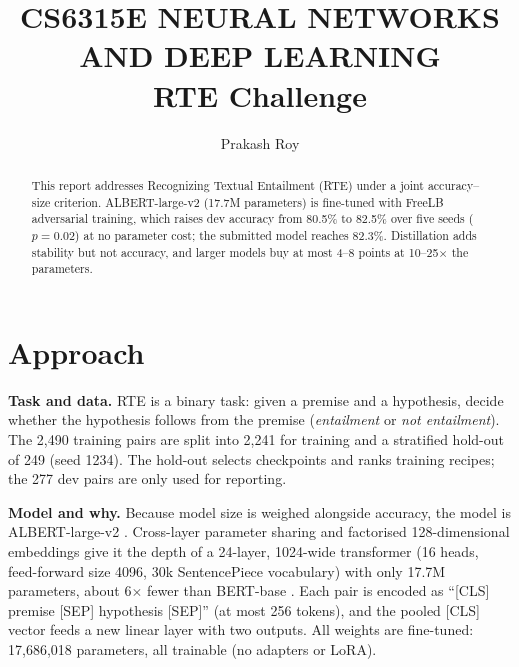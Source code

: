 \documentclass[11pt]{article}
\title{\vspace{-2.0cm}\textbf{CS6315E NEURAL NETWORKS AND DEEP LEARNING}\\[4pt]
       \Large RTE Challenge}
\author{Prakash Roy}
\date{}
\begin{document}
\maketitle
\vspace{-1.5cm}

\begin{abstract}
\noindent This report addresses Recognizing Textual Entailment (RTE) under a joint accuracy--size criterion.
ALBERT-large-v2 (17.7M parameters) is fine-tuned with FreeLB adversarial training, which raises dev accuracy from
80.5\% to 82.5\% over five seeds ($p=0.02$) at no parameter cost; the submitted model reaches 82.3\%. Distillation
adds stability but not accuracy, and larger models buy at most 4--8 points at 10--25$\times$ the parameters.
\end{abstract}

\section{Approach}

\textbf{Task and data.} RTE \cite{dagan2006pascal,wang2019glue} is a binary task: given a premise and a hypothesis, decide
whether the hypothesis follows from the premise (\emph{entailment} or \emph{not entailment}). The 2,490 training pairs are split into 2,241 for training and a
stratified hold-out of 249 (seed 1234). The hold-out selects checkpoints and ranks training recipes; the 277 dev
pairs are only used for reporting.

\textbf{Model and why.} Because model size is weighed alongside accuracy, the model is ALBERT-large-v2
\cite{lan2020albert}. Cross-layer parameter sharing and factorised 128-dimensional embeddings give it the depth of
a 24-layer, 1024-wide transformer (16 heads, feed-forward size 4096, 30k SentencePiece vocabulary) with only 17.7M
parameters, about 6$\times$ fewer than BERT-base \cite{devlin2019bert}. Each pair is encoded as
``[CLS] premise [SEP] hypothesis [SEP]'' (at most 256 tokens), and the pooled [CLS] vector feeds a new linear
layer with two outputs. All weights are fine-tuned: 17,686,018 parameters, all trainable (no adapters or LoRA).
\end{document}

